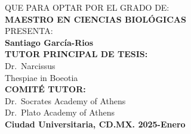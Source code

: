 \documentclass[
  10pt]{article}
\begin{document}
\begin{titlepage}
\begin{center}
        {\large QUE PARA OPTAR POR EL GRADO DE:}\\[0.15cm]
        {\Large \textbf{MAESTRO EN CIENCIAS BIOLÓGICAS}}\\[0.8cm]
        
        {\large PRESENTA:}\\[0.3cm]
        {\LARGE \textbf{Santiago García-Rios}}\\[0.8cm]
        
        {\small \textbf{TUTOR PRINCIPAL DE TESIS:}}\\
        {\small  Dr.~Narcissus }\\
        {\small  Thespiae in Boeotia }\\[0.5cm]
        
        {\small \textbf{COMITÉ TUTOR:}}\\
        {\small  Dr.~Socrates } {\small  Academy of Athens }\\
        {\small  Dr.~Plato } {\small  Academy of Athens }\\
        
        \vfill
                {\small \textbf{{Ciudad Universitaria,
CD.MX.} \hfill {2025-Enero}}}\\
                
    \end{center}
\end{titlepage}



\newpage
\begin{center}
\end{center}
\end{document}
